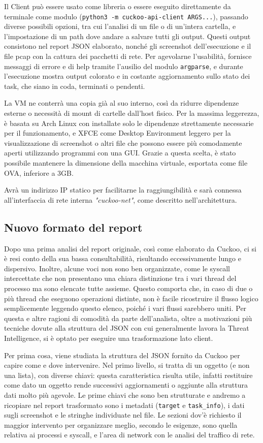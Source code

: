 Il Client può essere usato come libreria o essere eseguito direttamente da terminale come modulo (\texttt{python3 -m cuckoo-api-client ARGS...}), passando diverse possibili opzioni, tra cui l'analisi di un file o di un'intera cartella, e l'impostazione di un path dove andare a salvare tutti gli output.
Questi output consistono nel report JSON elaborato, nonché gli screenshot dell'esecuzione e il file pcap con la cattura dei pacchetti di rete.
Per agevolarne l'usabilità, fornisce messaggi di errore e di help tramite l'ausilio del modulo \texttt{argparse}, e durante l'esecuzione mostra output colorato e in costante aggiornamento sullo stato dei task, che siano in coda, terminati o pendenti.

La VM ne conterrà una copia già al suo interno, così da ridurre dipendenze esterne o necessità di mount di cartelle dall'host fisico. Per la massima leggerezza, è basata su Arch Linux con installate solo le dipendenze strettamente necessarie per il funzionamento, e XFCE come Desktop Environment leggero per la visualizzazione di screenshot o altri file che possono essere più comodamente aperti utilizzando programmi con una GUI. Grazie a questa scelta, è stato possibile mantenere la dimensione della macchina virtuale, esportata come file OVA, inferiore a 3GB.

Avrà un indirizzo IP statico per facilitarne la raggiungibilità e sarà connessa all'interfaccia di rete interna \emph{"cuckoo-net"}, come descritto nell'architettura.

\subsection{Nuovo formato del report}
Dopo una prima analisi del report originale, così come elaborato da Cuckoo, ci si è resi conto della sua bassa consultabilità, risultando eccessivamente lungo e dispersivo. Inoltre, alcune voci non sono ben organizzate, come le syscall intercettate che non presentano una chiara distinzione tra i vari thread del processo ma sono elencate tutte assieme. Questo comporta che, in caso di due o più thread che eseguono operazioni distinte, non è facile ricostruire il flusso logico semplicemente leggendo questo elenco, poiché i vari flussi sarebbero uniti.
Per questa e altre ragioni di comodità da parte dell'analista, oltre a motivazioni più tecniche dovute alla struttura del JSON con cui generalmente lavora la Threat Intelligence, si è optato per eseguire una trasformazione lato client.

Per prima cosa, viene studiata la struttura del JSON fornito da Cuckoo per capire come e dove intervenire. Nel primo livello, si tratta di un oggetto (e non una lista), con diverse chiavi: questa caratteristica risulta utile, infatti restituire come dato un oggetto rende successivi aggiornamenti o aggiunte alla struttura dati molto più agevole.
Le prime chiavi che sono ben strutturate e andremo a ricopiare nel report trasformato sono i metadati (\texttt{target} e \texttt{task\_info}), i dati sugli screenshot e le stringhe individuate nel file.
Le sezioni dov'è richiesto il maggior intervento per organizzare meglio, secondo le esigenze, sono quella relativa ai processi e syscall, e l'area di network con le analisi del traffico di rete.

